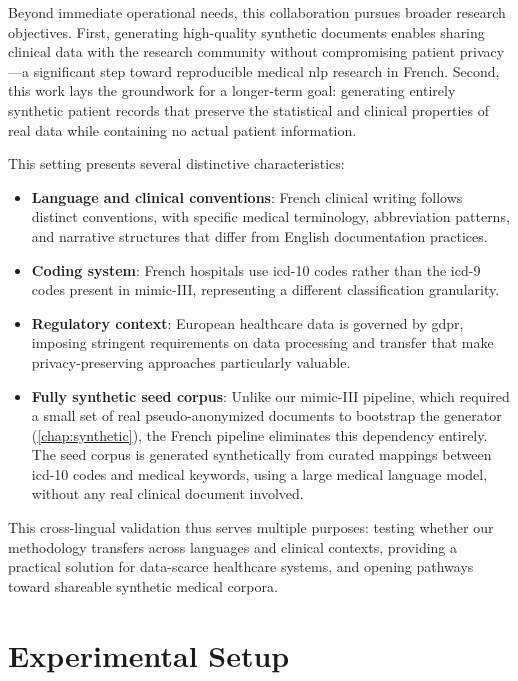 Beyond immediate operational needs, this collaboration pursues broader research objectives.
First, generating high-quality synthetic documents enables sharing clinical data with the research community without compromising patient privacy---a significant step toward reproducible medical \gls{nlp} research in French.
Second, this work lays the groundwork for a longer-term goal: generating entirely synthetic patient records that preserve the statistical and clinical properties of real data while containing no actual patient information.

This setting presents several distinctive characteristics:

\begin{itemize}
    \item \textbf{Language and clinical conventions}: French clinical writing follows distinct conventions, with specific medical terminology, abbreviation patterns, and narrative structures that differ from English documentation practices.

    \item \textbf{Coding system}: French hospitals use \gls{icd}-10 codes rather than the \gls{icd}-9 codes present in \gls{mimic}-III, representing a different classification granularity.

    \item \textbf{Regulatory context}: European healthcare data is governed by \gls{gdpr}, imposing stringent requirements on data processing and transfer that make privacy-preserving approaches particularly valuable.

    \item \textbf{Fully synthetic seed corpus}: Unlike our \gls{mimic}-III pipeline, which required a small set of real pseudo-anonymized documents to bootstrap the generator (\autoref{chap:synthetic}), the French pipeline eliminates this dependency entirely.
    The seed corpus is generated synthetically from curated mappings between \gls{icd}-10 codes and medical keywords, using a large medical language model, without any real clinical document involved.
\end{itemize}

This cross-lingual validation thus serves multiple purposes: testing whether our methodology transfers across languages and clinical contexts, providing a practical solution for data-scarce healthcare systems, and opening pathways toward shareable synthetic medical corpora.

\section{Experimental Setup}


